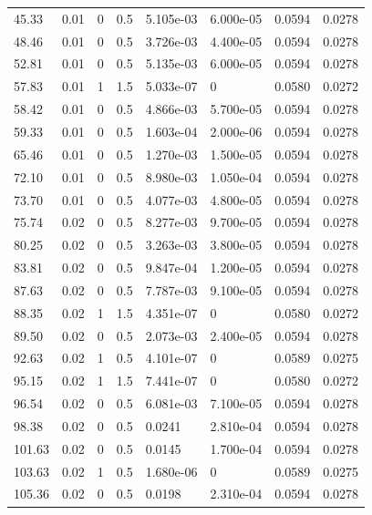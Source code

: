 \documentclass[preview]{standalone}
\begin{document}
{{\begin{tabular}{L{1.2cm}C{1.2cm} C{0.3cm}C{0.5cm} C{1.4cm}C{1.4cm} C{1.4cm}C{1.4cm}}
  45.33  &  0.01  & 0     & 0.5 &  5.105e-03  & 6.000e-05  & 0.0594 &  0.0278   \\ 
  48.46  &  0.01  & 0     & 0.5 &  3.726e-03  & 4.400e-05  & 0.0594 &  0.0278   \\ 
  52.81  &  0.01  & 0     & 0.5 &  5.135e-03  & 6.000e-05  & 0.0594 &  0.0278   \\ 
  57.83  &  0.01  & 1     & 1.5 &  5.033e-07  & 0  & 0.0580 &  0.0272   \\ 
  58.42  &  0.01  & 0     & 0.5 &  4.866e-03  & 5.700e-05  & 0.0594 &  0.0278   \\ 
  59.33  &  0.01  & 0     & 0.5 &  1.603e-04  & 2.000e-06  & 0.0594 &  0.0278   \\ 
  65.46  &  0.01  & 0     & 0.5 &  1.270e-03  & 1.500e-05  & 0.0594 &  0.0278   \\ 
  72.10  &  0.01  & 0     & 0.5 &  8.980e-03  & 1.050e-04  & 0.0594 &  0.0278   \\ 
  73.70  &  0.01  & 0     & 0.5 &  4.077e-03  & 4.800e-05  & 0.0594 &  0.0278   \\ 
  75.74  &  0.02  & 0     & 0.5 &  8.277e-03  & 9.700e-05  & 0.0594 &  0.0278   \\ 
  80.25  &  0.02  & 0     & 0.5 &  3.263e-03  & 3.800e-05  & 0.0594 &  0.0278   \\ 
  83.81  &  0.02  & 0     & 0.5 &  9.847e-04  & 1.200e-05  & 0.0594 &  0.0278   \\ 
  87.63  &  0.02  & 0     & 0.5 &  7.787e-03  & 9.100e-05  & 0.0594 &  0.0278   \\ 
  88.35  &  0.02  & 1     & 1.5 &  4.351e-07  & 0  & 0.0580 &  0.0272   \\ 
  89.50  &  0.02  & 0     & 0.5 &  2.073e-03  & 2.400e-05  & 0.0594 &  0.0278   \\ 
  92.63  &  0.02  & 1     & 0.5 &  4.101e-07  & 0  & 0.0589 &  0.0275   \\ 
  95.15  &  0.02  & 1     & 1.5 &  7.441e-07  & 0  & 0.0580 &  0.0272   \\ 
  96.54  &  0.02  & 0     & 0.5 &  6.081e-03  & 7.100e-05  & 0.0594 &  0.0278   \\ 
  98.38  &  0.02  & 0     & 0.5 &  0.0241  & 2.810e-04  & 0.0594 &  0.0278   \\ 
  101.63  &  0.02  & 0     & 0.5 &  0.0145  & 1.700e-04  & 0.0594 &  0.0278   \\ 
  103.63  &  0.02  & 1     & 0.5 &  1.680e-06  & 0  & 0.0589 &  0.0275   \\ 
  105.36  &  0.02  & 0     & 0.5 &  0.0198  & 2.310e-04  & 0.0594 &  0.0278   \\ 

\end{tabular}}}
\end{document}
